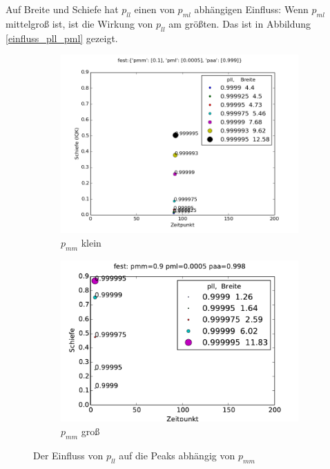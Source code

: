 Auf Breite und Schiefe hat $p_{ll}$ einen von $p_{ml}$ abhängigen Einfluss: Wenn $p_{ml}$ mittelgroß ist, ist die Wirkung von $p_{ll}$ am größten. Das ist in Abbildung \ref{einfluss_pll_pml} gezeigt.

\begin{figure}
\begin{subfigure}[b]{0.49\textwidth}
\includegraphics[width=\textwidth]{bilder/pll/3fest_01_00005_0999_p}
\caption{$p_{mm}$ klein}
\end{subfigure}
\begin{subfigure}[b]{0.49\textwidth}
\includegraphics[width=\textwidth]{bilder/pll/3fest_09_00005_0999_p}
\caption{$p_{mm}$ groß}
\end{subfigure}
\caption{Der Einfluss von $p_{ll}$ auf die Peaks abhängig von $p_{mm}$}
\label{einfluss_pll_pmm}
\end{figure}

